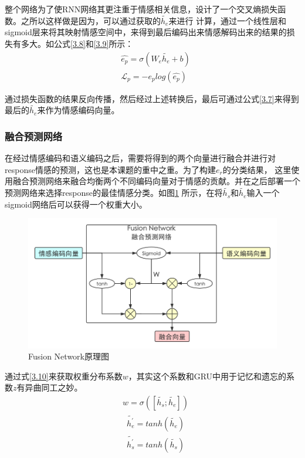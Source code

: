 \documentclass[supercite]{HustGraduPaper}
\theoremstyle{definition}
\begin{document}
整个网络为了使RNN网络其更注重于情感相关信息，设计了一个交叉熵损失函数。之所以这样做是因为，可以通过获取的$\widetilde{h_e}$来进行
计算，通过一个线性层和sigmoid层来将其映射情感空间中，来得到最后编码出来情感解码出来的结果的损失有多大。如公式\ref{3.8}和\ref{3.9}所示：
\begin{align}
  &\hat{e_p} = \sigma(W_e \widetilde{h_e} + b) \label{3.8}\\
  &\mathcal{L}_p = -e_p log(\hat{e_p}) \label{3.9}
\end{align}

通过损失函数的结果反向传播，然后经过上述转换后，最后可通过公式\ref{3.7}来得到最后的$\widetilde{h_e}$来作为情感编码向量。

\subsubsection{融合预测网络}
在经过情感编码和语义编码之后，需要将得到的两个向量进行融合并进行对response情感的预测，这也是本课题的重中之重。为了构建$e_r$的分类结果，
这里使用融合预测网络来融合均衡两个不同编码向量对于情感的贡献。并在之后部署一个预测网络来选择response的最佳情感分类。如图\ref{Fig.fusionnetwork}
所示，在将$\widetilde{h_s}$和$\widetilde{h_e}$输入一个sigmoid网络后可以获得一个权重大小。

\begin{figure}[htbp] %
  \centering %
  \includegraphics[width=1\textwidth]{images/fusionnetwork.png} %
  \caption{Fusion Network原理图} %
  \label{Fig.fusionnetwork} %
\end{figure}
通过式\ref{3.10}来获取权重分布系数$w$，其实这个系数和GRU中用于记忆和遗忘的系数$z$有异曲同工之妙。
\begin{align}
  &w = \sigma([\widetilde{h_s};\widetilde{h_e}]) \label{3.10}
\end{align}
\begin{align}
  &{\widetilde{h_e^{'}}} = tanh(\widetilde{h_e}) \label{3.11}\\
  &{\widetilde{h_s^{'}}} = tanh(\widetilde{h_s}) \label{3.12}
\end{align}
\end{document}

